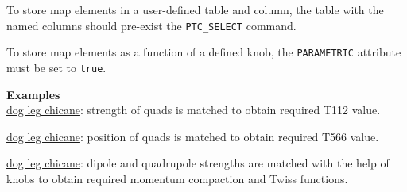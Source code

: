 To store map elements in a user-defined table and column, the table with the
named columns should pre-exist the \texttt{PTC\_SELECT} command.

To store map elements as a function of a defined knob, the
\texttt{PARAMETRIC} attribute must be set to \texttt{true}.


\textbf{Examples}\\

\href{http://cern.ch/frs/mad-X_examples/ptc_madx_interface/ptc_secordmatch/chicane.madx}{dog
  leg chicane}: strength of quads is matched to obtain required T112
value.    

\href{http://cern.ch/frs/mad-X_examples/ptc_madx_interface/eplacement/chicane.madx}{dog
  leg chicane}: position of quads is matched to obtain required T566
value.   

\href{http://cern.ch/frs/mad-X_examples/ptc_madx_interface/matchwithknobs/matchwithknobs.madx}{dog
  leg chicane}: dipole and quadrupole strengths are matched with the
help of knobs to obtain required momentum compaction and Twiss
functions.   








